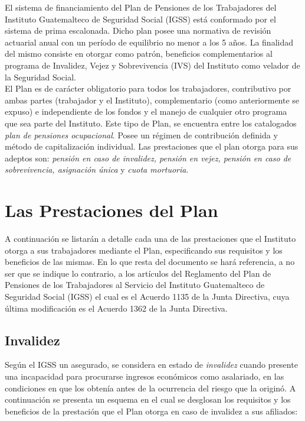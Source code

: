 \documentclass[12pt,letterpaper,titlepage]{article}
\begin{document}
{El sistema de financiamiento del Plan de Pensiones de los Trabajadores del Instituto Guatemalteco de Seguridad Social (IGSS) está conformado por el sistema de prima escalonada. Dicho plan posee una normativa de revisión actuarial anual con un período de equilibrio no menor a los 5 años. La finalidad del mismo consiste en otorgar como patrón, beneficios complementarios al programa de Invalidez, Vejez y Sobrevivencia (IVS) del Instituto como velador de la Seguridad Social. \\

El Plan es de carácter obligatorio para todos los trabajadores, contributivo por ambas partes (trabajador y el Instituto), complementario (como anteriormente se expuso) e independiente de los fondos y el manejo de cualquier otro programa que sea parte del Instituto. Este tipo de Plan, se encuentra entre los catalogados \textit{plan de pensiones ocupacional}. Posee un régimen de contribución definida y método de capitalización individual. Las prestaciones que el plan otorga para sus adeptos son: \textit{pensión en caso de invalidez, pensión en vejez, pensión en caso de sobrevivencia, asignación única} y \textit{cuota mortuoria}.

\newpage
\section{Las Prestaciones del Plan}

A continuación se listarán a detalle cada una de las prestaciones que el Instituto otorga a sus trabajadores mediante el Plan, especificando sus requisitos y los beneficios de las mismas. En lo que resta del documento se hará referencia, a no ser que se indique lo contrario, a los artículos del Reglamento del Plan de Pensiones de los Trabajadores al Servicio del Instituto Guatemalteco de Seguridad Social (IGSS) el cual es el Acuerdo 1135 de la Junta Directiva, cuya última modificación es el Acuerdo 1362 de la Junta Directiva.

\subsection{Invalidez}

Según el IGSS un asegurado, se considera en estado de \textit{invalidez} cuando presente una incapacidad para procurarse ingresos económicos como asalariado, en las condiciones en que los obtenía antes de la ocurrencia del riesgo que la originó. A continuación se presenta un esquema en el cual se desglosan los requisitos y los beneficios de la prestación que el Plan otorga en caso de invalidez a sus afiliados:

}
\end{document}
